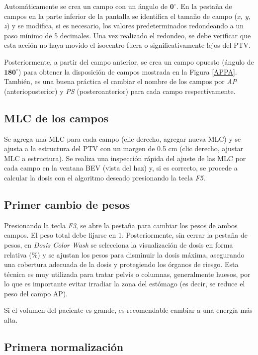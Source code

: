 \documentclass{article}
\begin{document}
Automáticamente se crea un campo con un ángulo de $\mathbf{0^{\circ}}$. En la pestaña de campos en la parte inferior de la pantalla se identifica el tamaño de campo (\textit{x, y, z}) y se modifica, si es necesario, los valores predeterminados redondeando a un paso mínimo de 5 decimales. Una vez realizado el redondeo, se debe verificar que esta acción no haya movido el isocentro fuera o significativamente lejos del PTV.

Posteriormente, a partir del campo anterior, se crea un campo opuesto (ángulo de $\mathbf{180^{\circ}}$) para obtener la disposición de campos mostrada en la Figura \ref{APPA}. También, es una buena práctica el cambiar el nombre de los campos por \textit{AP} (anterioposterior) y \textit{PS} (posteroanterior) para cada campo respectivamente.

\subsection*{MLC de los campos}

Se agrega una MLC para cada campo (clic derecho, agregar nueva MLC) y se ajusta a la estructura del PTV con un margen de 0.5 cm (clic derecho, ajustar MLC a estructura). Se realiza una inspección rápida del ajuste de las MLC por cada campo en la ventana BEV (vista del haz) y, si es correcto, se procede a calcular la dosis con el algoritmo deseado presionando la tecla \textit{F5}.

\subsection*{Primer cambio de pesos}

Presionando la tecla \textit{F3}, se abre la pestaña para cambiar los pesos de ambos campos. El peso total debe fijarse en 1. Posteriormente, sin cerrar la pestaña de pesos, en \textit{Dosis Color Wash} se selecciona la visualización de dosis en forma relativa (\%) y se ajustan los pesos para disminuir la dosis máxima, asegurando una cobertura adecuada de la dosis y protegiendo los órganos de riesgo. Esta técnica es muy utilizada para tratar pelvis o columnas, generalmente huesos, por lo que es importante evitar irradiar la zona del estómago (es decir, se reduce el peso del campo AP).

Si el volumen del paciente es grande, es recomendable cambiar a una energía más alta.

\subsection*{Primera normalización}
\end{document}
